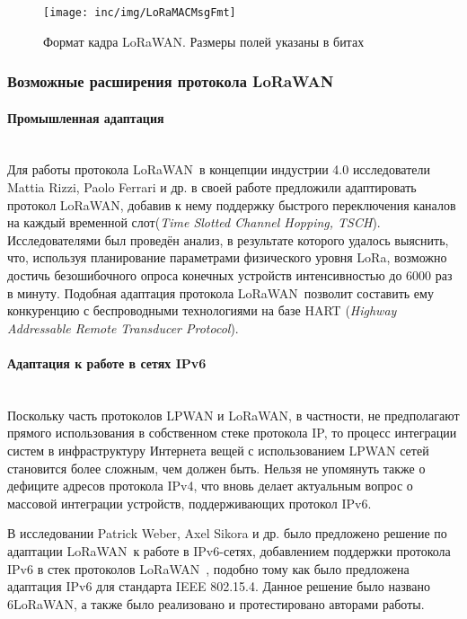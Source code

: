 \begin{figure}[!h]
  \centering
  \texttt{[image: inc/img/LoRaMACMsgFmt]}
  \caption{Формат кадра LoRaWAN\texttrademark. Размеры полей указаны в битах 
\cite{augustin2016}}
  \label{fig:macframe}
\end{figure}


\subsubsection{Возможные расширения протокола LoRaWAN\texttrademark}

\paragraph{Промышленная адаптация} \hspace{0pt}\\

Для работы протокола LoRaWAN\texttrademark~в концепции индустрии 4.0 
исследователи Mattia 
Rizzi, Paolo Ferrari и др. в своей работе \cite{Rizzi2017} предложили 
адаптировать протокол LoRaWAN\texttrademark, добавив к нему поддержку быстрого 
переключения 
каналов на каждый временной слот(\textit{Time Slotted Channel Hopping, TSCH}).
Исследователями был проведён анализ, в результате которого удалось выяснить, 
что, используя планирование параметрами физического уровня LoRa\texttrademark, 
возможно 
достичь безошибочного опроса конечных устройств интенсивностью до 6000 раз в 
минуту.
Подобная адаптация протокола LoRaWAN\texttrademark~позволит составить ему 
конкуренцию с 
беспроводными технологиями на базе HART (\textit{Highway Addressable Remote 
Transducer Protocol}).

\paragraph{Адаптация к работе в сетях IPv6} \hspace{0pt}\\

Поскольку часть протоколов LPWAN и LoRaWAN\texttrademark, в частности, не 
предполагают 
прямого использования в собственном стеке протокола IP, то процесс интеграции
систем в инфраструктуру Интернета вещей с использованием LPWAN сетей становится 
более сложным, чем должен быть.
Нельзя не упомянуть также о дефиците адресов протокола IPv4, что вновь делает 
актуальным вопрос о массовой интеграции устройств, поддерживающих протокол 
IPv6.

В исследовании Patrick Weber, Axel Sikora и др. было предложено решение по 
адаптации LoRaWAN\texttrademark~к работе в IPv6-сетях, добавлением поддержки 
протокола IPv6 в 
стек протоколов LoRaWAN\texttrademark~\cite{weber2016ipv6}, подобно тому как 
было предложена 
адаптация IPv6 для стандарта IEEE 802.15.4.
Данное решение было названо 6LoRaWAN, а также было реализовано и 
протестировано авторами работы.

